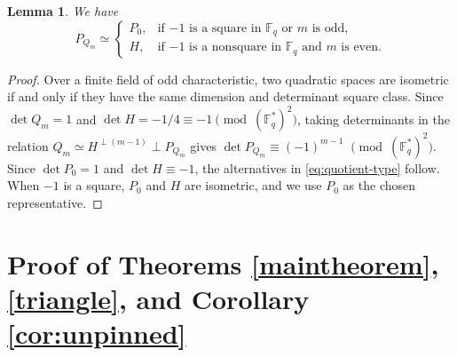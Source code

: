 \documentclass[11pt]{article}
\newtheorem{lemma}[theorem]{Lemma}
\newcommand{\F}{\mathbb F}
\begin{document}

\begin{lemma}
\label{lem:quotient-type}
We have 
\begin{equation} \label{eq:quotient-type}
P_{Q_m}\simeq
\begin{cases}
P_0,&\text{if $-1$ is a square in $\F_q$ or $m$ is odd},\\
H,&\text{if $-1$ is a nonsquare in $\F_q$ and $m$ is even}.
\end{cases}
\end{equation}
\end{lemma}

\begin{proof}
Over a finite field of odd characteristic, two quadratic spaces are isometric if and only if they have the same dimension and determinant square class. Since $\det Q_m=1$ and $\det H=-1/4\equiv-1\pmod{(\F_q^*)^2}$, taking determinants in the relation $Q_m\simeq H^{\perp(m-1)}\perp P_{Q_m}$ gives $\det P_{Q_m}\equiv(-1)^{m-1}$ $\pmod{(\F_q^*)^2}$. Since $\det P_0=1$ and $\det H\equiv-1$, the alternatives in \eqref{eq:quotient-type} follow.  When $-1$ is a square, $P_0$ and $H$ are isometric, and we use $P_0$ as the chosen representative.
\end{proof}


\section{Proof of Theorems \ref{maintheorem}, \ref{triangle}, and Corollary \ref{cor:unpinned}}
\end{document}
